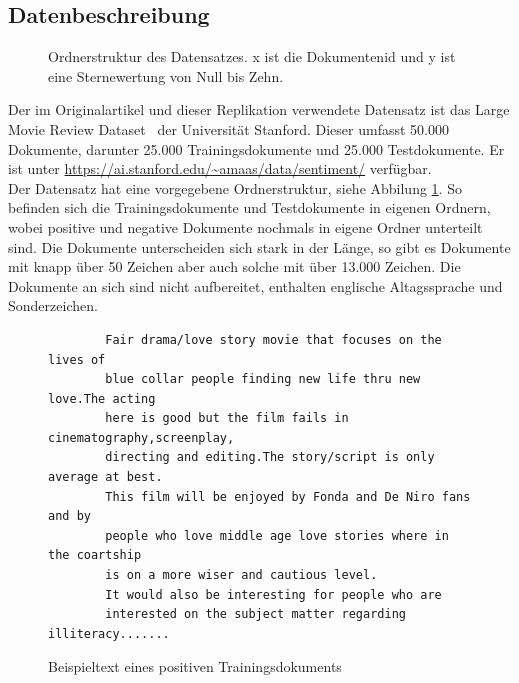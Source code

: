 \documentclass[DIV=13,fontsize=11pt]{scrartcl}
\begin{document}
\subsection{Datenbeschreibung}

\begin{figure}[H]
    \centering
    \begin{minipage}{5cm}
    \end{minipage}
    \caption{Ordnerstruktur des Datensatzes. x ist die Dokumentenid und y ist eine Sternewertung von Null bis Zehn.}
    \label{fig:filestruc}
\end{figure}

Der im Originalartikel und dieser Replikation verwendete Datensatz ist das Large Movie
Review Dataset~\cite{maas-EtAl:2011:ACL-HLT2011} der Universität Stanford.
Dieser umfasst 50.000 Dokumente, darunter 25.000 Trainingsdokumente und 25.000 Testdokumente. Er ist unter
\url{https://ai.stanford.edu/~amaas/data/sentiment/} verfügbar.\\

Der Datensatz hat eine vorgegebene Ordnerstruktur, siehe Abbilung \ref{fig:filestruc}.
So befinden sich die Trainingsdokumente und Testdokumente in eigenen Ordnern,
wobei positive und negative Dokumente nochmals in eigene Ordner unterteilt sind.
Die Dokumente unterscheiden sich stark in der Länge, so gibt es Dokumente mit knapp über 50 Zeichen
aber auch solche mit über 13.000 Zeichen.
Die Dokumente an sich sind nicht aufbereitet, enthalten englische Altagssprache und Sonderzeichen.

\begin{figure}[H]
    \centering
    \begin{lstlisting}
        Fair drama/love story movie that focuses on the lives of 
        blue collar people finding new life thru new love.The acting 
        here is good but the film fails in cinematography,screenplay,
        directing and editing.The story/script is only average at best.
        This film will be enjoyed by Fonda and De Niro fans and by 
        people who love middle age love stories where in the coartship 
        is on a more wiser and cautious level.
        It would also be interesting for people who are 
        interested on the subject matter regarding illiteracy.......
    \end{lstlisting}
    \caption{Beispieltext eines positiven Trainingsdokuments}
\end{figure}
\end{document}
